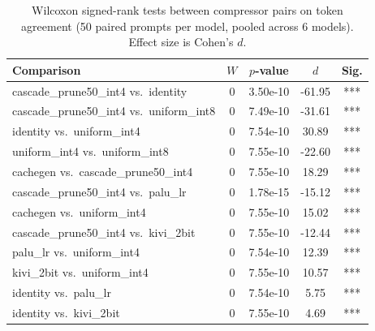 \begin{table}[t]
\centering
\caption{Wilcoxon signed-rank tests between compressor pairs on token agreement (50 paired prompts per model, pooled across 6 models). Effect size is Cohen's $d$.}
\label{tab:significance}
\small
\begin{tabular}{lcccc}
\toprule
\textbf{Comparison} & \textbf{$W$} & \textbf{$p$-value} & \textbf{$d$} & \textbf{Sig.} \\
\midrule
  cascade\_prune50\_int4 vs.\ identity & 0 & 3.50e-10 & -61.95 & *** \\
  cascade\_prune50\_int4 vs.\ uniform\_int8 & 0 & 7.49e-10 & -31.61 & *** \\
  identity vs.\ uniform\_int4 & 0 & 7.54e-10 & 30.89 & *** \\
  uniform\_int4 vs.\ uniform\_int8 & 0 & 7.55e-10 & -22.60 & *** \\
  cachegen vs.\ cascade\_prune50\_int4 & 0 & 7.55e-10 & 18.29 & *** \\
  cascade\_prune50\_int4 vs.\ palu\_lr & 0 & 1.78e-15 & -15.12 & *** \\
  cachegen vs.\ uniform\_int4 & 0 & 7.55e-10 & 15.02 & *** \\
  cascade\_prune50\_int4 vs.\ kivi\_2bit & 0 & 7.55e-10 & -12.44 & *** \\
  palu\_lr vs.\ uniform\_int4 & 0 & 7.54e-10 & 12.39 & *** \\
  kivi\_2bit vs.\ uniform\_int4 & 0 & 7.55e-10 & 10.57 & *** \\
  identity vs.\ palu\_lr & 0 & 7.54e-10 & 5.75 & *** \\
  identity vs.\ kivi\_2bit & 0 & 7.55e-10 & 4.69 & *** \\
\bottomrule
\end{tabular}
\end{table}
